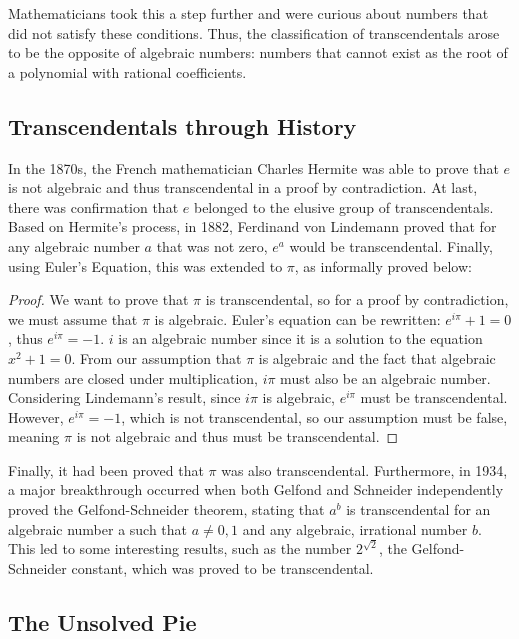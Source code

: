 \documentclass{article}
\begin{document}
\begin{multicols}{2}
Mathematicians took this a step further and were curious about numbers that did not satisfy these conditions. Thus, the classification of transcendentals arose to be the opposite of algebraic numbers: numbers that cannot exist as the root of a polynomial with rational coefficients.

\subsection*{Transcendentals through History}

In the 1870s, the French mathematician Charles Hermite was able to prove that $e$ is not algebraic and thus transcendental in a proof by contradiction. At last, there was confirmation that $e$ belonged to the elusive group of transcendentals. Based on Hermite’s process, in 1882, Ferdinand von Lindemann proved that for any algebraic number $a$ that was not zero, $e^{a}$ would be transcendental. Finally, using Euler’s Equation, this was extended to $\pi$, as informally proved below:

\begin{proof}
We want to prove that $\pi$ is transcendental, so for a proof by contradiction, we must assume that $\pi$ is algebraic. Euler’s equation can be rewritten: $e^{i\pi} + 1 = 0$, thus $e^{i\pi} = -1$. $i$ is an algebraic number since it is a solution to the equation $x^{2} + 1 = 0$. From our assumption that $\pi$ is algebraic and the fact that algebraic numbers are closed under multiplication, $i\pi$ must also be an algebraic number. Considering Lindemann’s result, since $i\pi$ is algebraic, $e^{i\pi}$ must be transcendental. However, $e^{i\pi} = -1$, which is not transcendental, so our assumption must be false, meaning $\pi$ is not algebraic and thus must be transcendental.
\end{proof}

Finally, it had been proved that $\pi$ was also transcendental. Furthermore, in 1934, a major breakthrough occurred when both Gelfond and Schneider independently proved the Gelfond-Schneider theorem, stating that $a^{b}$ is transcendental for an algebraic number a such that $a \neq 0, 1$ and any algebraic, irrational number $b$. This led to some interesting results, such as the number $2^{\sqrt{2}}$, the Gelfond-Schneider constant, which was proved to be transcendental.

\subsection*{The Unsolved Pie}


\end{multicols}
\end{document}
